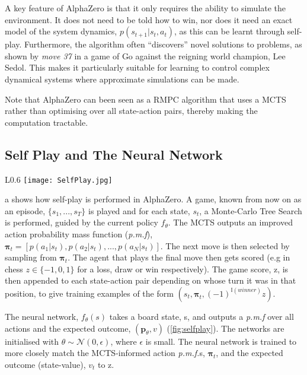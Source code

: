 \documentclass[../main.tex]{subfiles}
\begin{document}
A key feature of AlphaZero is that it only requires the ability to simulate the environment. It does not need to be told how to win, nor does it need an exact model of the system dynamics, $p(s_{t+1} |s_t, a_t)$, as this can be learnt through self-play. Furthermore, the algorithm often ``discovers'' novel solutions to problems, as shown by \textit{move 37} in a game of Go against the reigning world champion, Lee Sedol. This makes it particularly suitable for learning to control complex dynamical systems where approximate simulations can be made.

Note that AlphaZero can been seen as a RMPC algorithm that uses a MCTS rather than optimising over all state-action pairs, thereby making the computation tractable.

\subsection{Self Play and The Neural Network}

\begin{wrapfigure}{L}{0.6\textwidth}
   \centering
   \texttt{[image: SelfPlay.jpg]}
   \caption{A schematic showing how self-play and policy training are performed. Taken from \cite{AlphaGoZero}.}
   \label{fig:selfplay}
   \vspace{0.5cm}
\end{wrapfigure}

a
shows how self-play is performed in AlphaZero. A game, known from now on as an episode, $\{s_1, ..., s_T\}$ is played and for each state, $s_t$, a Monte-Carlo Tree Search is performed, guided by the current policy $f_\theta$. The MCTS outputs an improved action probability mass function (\textit{p.m.f}), $\boldsymbol{\pi}_t = [p(a_1|s_t), p(a_2|s_t), ..., p(a_N|s_t)]$. The next move is then selected by sampling from $\boldsymbol{\pi}_t$. The agent that plays the final move then gets scored (e.g in chess $z \in \{-1, 0, 1\} $ for a loss, draw or win respectively). The game score, z, is then appended to each state-action pair depending on whose turn it was in that position, to give training examples of the form $(s_t, \boldsymbol{\pi}_t, (-1)^{\mathbb{I}(winner)}z)$. 

The neural network, $f_\theta(s)$ takes a board state, s, and outputs a \textit{p.m.f} over all actions and the expected outcome, $(\boldsymbol{p}_\theta, v)$ (\cref{fig:selfplay}). The networks are initialised with $\theta \sim \mathcal{N}(0, \epsilon)$, where $\epsilon$ is small. The neural network is trained to more closely match the MCTS-informed action \textit{p.m.f.}s, $\boldsymbol{\pi}_t$, and the expected outcome (state-value), $v_t$ to z.
\end{document}
